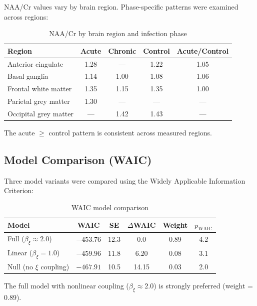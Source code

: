 \documentclass[11pt]{article}
\begin{document}
NAA/Cr values vary by brain region. Phase-specific patterns were examined across regions:

\begin{table}[h]
\centering
\caption{NAA/Cr by brain region and infection phase}
\begin{tabular}{lcccc}
\toprule
\textbf{Region} & \textbf{Acute} & \textbf{Chronic} & \textbf{Control} & \textbf{Acute/Control} \\
\midrule
Anterior cingulate & 1.28 & --- & 1.22 & 1.05 \\
Basal ganglia & 1.14 & 1.00 & 1.08 & 1.06 \\
Frontal white matter & 1.35 & 1.15 & 1.35 & 1.00 \\
Parietal grey matter & 1.30 & --- & --- & --- \\
Occipital grey matter & --- & 1.42 & 1.43 & --- \\
\bottomrule
\end{tabular}
\end{table}

The acute $\geq$ control pattern is consistent across measured regions.

\subsection{Model Comparison (WAIC)}

Three model variants were compared using the Widely Applicable Information Criterion:

\begin{table}[h]
\centering
\caption{WAIC model comparison}
\begin{tabular}{lccccc}
\toprule
\textbf{Model} & \textbf{WAIC} & \textbf{SE} & $\Delta$\textbf{WAIC} & \textbf{Weight} & \textbf{$p_\text{WAIC}$} \\
\midrule
Full ($\beta_\xi \approx 2.0$) & $-453.76$ & 12.3 & 0.0 & 0.89 & 4.2 \\
Linear ($\beta_\xi = 1.0$) & $-459.96$ & 11.8 & 6.20 & 0.08 & 3.1 \\
Null (no $\xi$ coupling) & $-467.91$ & 10.5 & 14.15 & 0.03 & 2.0 \\
\bottomrule
\end{tabular}
\end{table}

The full model with nonlinear coupling ($\beta_\xi \approx 2.0$) is strongly preferred (weight = 0.89).

\newpage
\end{document}
